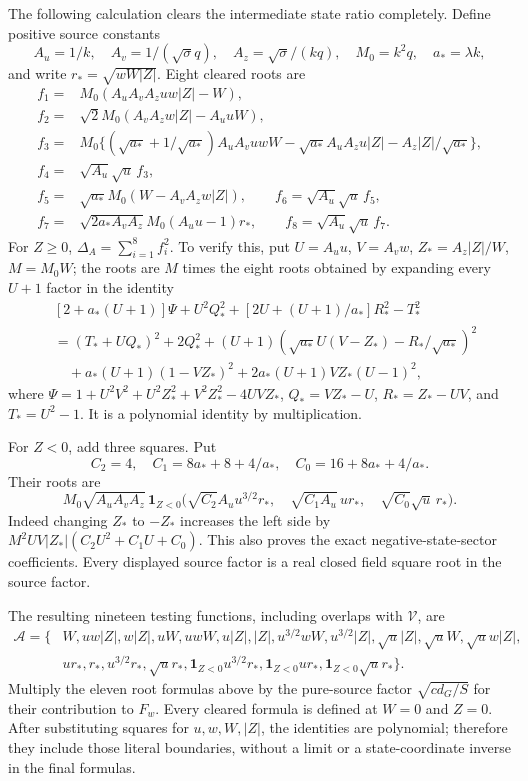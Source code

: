 The following calculation clears the intermediate state ratio
completely. Define positive source constants
\[
 A_u=1/k,\quad A_v=1/(\sqrt\sigma q),\quad
 A_z=\sqrt\sigma/(kq),\quad M_0=k^2q,\quad a_*=\lambda k,
\]
and write $r_* =\sqrt{wW|Z|}$. Eight cleared roots are
\[
\begin{split}
 f_1={}&M_0(A_uA_vA_zuw|Z|-W),\\
 f_2={}&\sqrt2 M_0(A_vA_zw|Z|-A_uuW),\\
 f_3={}&M_0\{(\sqrt{a_*}+1/\sqrt{a_*})A_uA_vuwW
                   -\sqrt{a_*}A_uA_zu|Z|-A_z|Z|/\sqrt{a_*}\},\\
 f_4={}&\sqrt{A_u}\sqrt u\,f_3,\\
 f_5={}&\sqrt{a_*}M_0(W-A_vA_zw|Z|),\qquad
 f_6=\sqrt{A_u}\sqrt u\,f_5,\\
 f_7={}&\sqrt{2a_*A_vA_z}M_0(A_uu-1)r_*,\qquad
 f_8=\sqrt{A_u}\sqrt u\,f_7.
\end{split}
\]
For $Z\ge0$, $\Delta_A=\sum_{i=1}^8f_i^2$. To verify this,
put $U=A_uu$, $V=A_vw$, $Z_*=A_z|Z|/W$, $M=M_0W$;
the roots are $M$ times the eight roots obtained by expanding
every $U+1$ factor in the identity
\begin{align*}
 &[2+a_*(U+1)]\Psi+U^2Q_*^2
       +[2U+(U+1)/a_*]R_*^2-T_*^2\\
 &=(T_*+UQ_*)^2+2Q_*^2
 +(U+1)(\sqrt{a_*}U(V-Z_*)-R_*/\sqrt{a_*})^2\\
 &\quad+a_*(U+1)(1-VZ_*)^2
                         +2a_*(U+1)VZ_*(U-1)^2,
\end{align*}
where $\Psi=1+U^2V^2+U^2Z_*^2+V^2Z_*^2-4UVZ_*$,
$Q_*=VZ_*-U$, $R_*=Z_*-UV$, and $T_*=U^2-1$.
It is a polynomial identity by multiplication.

For $Z<0$, add three squares. Put
\[
 C_2=4,\quad C_1=8a_*+8+4/a_*,\quad C_0=16+8a_*+4/a_*.
\]
Their roots are
\[
 M_0\sqrt{A_uA_vA_z}\,\boldsymbol1_{Z<0}
 \bigl(\sqrt{C_2}A_u u^{3/2}r_*,\quad
       \sqrt{C_1A_u}\,u r_*,\quad
       \sqrt{C_0}\sqrt u\,r_*\bigr).
\]
Indeed changing $Z_*$ to $-Z_*$ increases the left side by
$M^2UV|Z_*|(C_2U^2+C_1U+C_0)$. This also proves the exact
negative-state-sector coefficients. Every displayed source
factor is a real closed field square root in the source factor.

The resulting nineteen testing functions, including overlaps
with $\mathcal V$, are
\[
\begin{split}
 \mathcal A=\{&W,uw|Z|,w|Z|,uW,uwW,u|Z|,|Z|,
 u^{3/2}wW,u^{3/2}|Z|,\sqrt u|Z|,\sqrt uW,\sqrt u w|Z|,\\
 &ur_*,r_*,u^{3/2}r_*,\sqrt u r_*,
 \boldsymbol1_{Z<0}u^{3/2}r_*,
 \boldsymbol1_{Z<0}ur_*,\boldsymbol1_{Z<0}\sqrt u r_*\}.
\end{split}
\]
Multiply the eleven root formulas above by the pure-source factor
$\sqrt{cd_G/S}$ for their contribution to $F_w$.
Every cleared formula is defined at $W=0$ and $Z=0$. After
substituting squares for $u,w,W,|Z|$, the identities are polynomial;
therefore they include those literal boundaries, without a limit
or a state-coordinate inverse in the final formulas.

